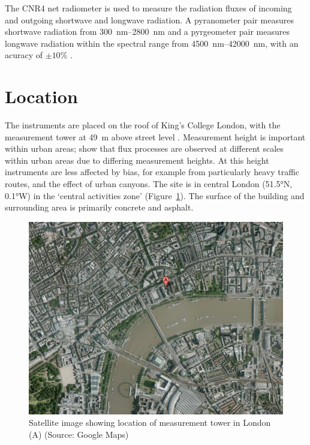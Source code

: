 \documentclass[a4paper,titlepage, twoside]{report}
\begin{document}
The CNR4 net radiometer is used to measure the radiation fluxes of incoming and outgoing shortwave and longwave radiation. A pyranometer pair measures shortwave radiation from \SIrange{300}{2800}{\nano\meter} and a pyrgeometer pair measures longwave radiation within the spectral range from \SIrange{4500}{42000}{\nano\meter}, with an acuracy of $\pm10\%$ \parencite{kipp}.

\section{Location}
The instruments are placed on the roof of King's College London, with the measurement tower at \SI{49}{\meter} above street level \parencite{kotthaus2}.  Measurement height is important within urban areas; \cite{kotthaus2} show that flux processes are observed at different scales within urban areas due to differing measurement heights. At this height instruments are less affected by bias, for example from particularly heavy traffic routes, and the effect of urban canyons. The site is in central London (\ang{51.5}N, \ang{0.1}W) in the `central activities zone' \parencite{kotthaus2} (Figure~\ref{fig:location}).  The surface of the building and surrounding area is primarily concrete and asphalt.

\begin{figure}
\includegraphics[width=\textwidth]{map.png}
\caption{Satellite image showing location of measurement tower in London (A) (Source: Google Maps)}
\label{fig:location}
\end{figure}
\end{document}
